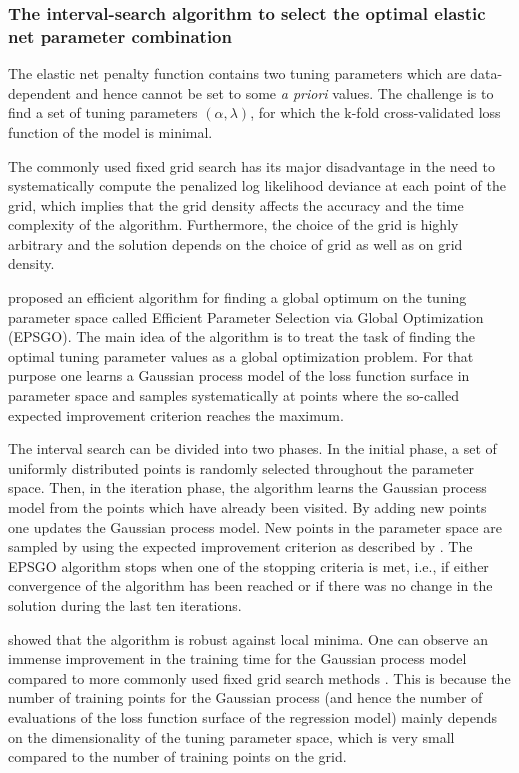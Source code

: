 \documentclass[nojss]{jss}
\begin{document}
\subsubsection{The interval-search algorithm to select the optimal elastic net parameter combination}
The elastic net penalty function contains two tuning parameters which are data-dependent and hence cannot be set to some \emph{a priori} values. The challenge is to find a set of tuning parameters $\left(\alpha,\lambda\right)$, for which the k-fold cross-validated loss function of the model is minimal.

The commonly used fixed grid search has its major disadvantage in the need to systematically compute the penalized log likelihood deviance at each point of the grid, which implies that the grid density affects the accuracy and the time complexity of the algorithm. Furthermore, the choice of the grid is highly arbitrary and the solution depends on the choice of grid as well as on grid density. 

 proposed an efficient algorithm for finding a global optimum on the tuning parameter space 
called Efficient Parameter Selection via Global Optimization (EPSGO). The main idea of the algorithm is to treat the task of finding the optimal tuning parameter values as a global optimization problem. For that purpose one learns a Gaussian process model of the loss function surface in parameter space and samples systematically at points where the so-called expected improvement criterion reaches the maximum. 

The interval search can be divided into two phases. In the initial phase, a set of uniformly distributed points is randomly selected throughout the parameter space. Then, in the iteration phase, the algorithm learns the Gaussian process model from the points which have already been visited. By adding new points one updates the Gaussian process model.
New points in the parameter space are sampled by using the expected improvement criterion as described by \citet{Jones1998}. The EPSGO algorithm stops when one of the stopping criteria is met, i.e., if either convergence of the algorithm has been reached or if there was no change in the solution during the last ten iterations.

 showed that the algorithm is robust against local minima. 
One can observe an immense improvement in the training time for the Gaussian process model compared to more commonly used fixed grid search methods \citep{froehlich2005}. This is because the number of training points for the Gaussian process (and hence the number of evaluations of the loss function surface of the regression model) mainly depends on the dimensionality of the tuning parameter space, which is very small compared to the number of training points on the grid.
\end{document}
